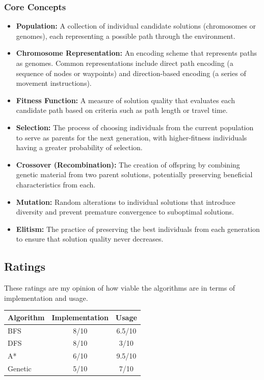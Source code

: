 \subsubsection{Core Concepts}
\begin{itemize}
    \item \textbf{Population:} A collection of individual candidate solutions (chromosomes or genomes), each representing a possible path through the environment.
    
    \item \textbf{Chromosome Representation:} An encoding scheme that represents paths as genomes. Common representations include direct path encoding (a sequence of nodes or waypoints) and direction-based encoding (a series of movement instructions).

    
    \item \textbf{Fitness Function:} A measure of solution quality that evaluates each candidate path based on criteria such as path length or travel time.    
    \item \textbf{Selection:} The process of choosing individuals from the current population to serve as parents for the next generation, with higher-fitness individuals having a greater probability of selection.
    
    \item \textbf{Crossover (Recombination):} The creation of offspring by combining genetic material from two parent solutions, potentially preserving beneficial characteristics from each.
    
    \item \textbf{Mutation:} Random alterations to individual solutions that introduce diversity and prevent premature convergence to suboptimal solutions.
    
    \item \textbf{Elitism:} The practice of preserving the best individuals from each generation to ensure that solution quality never decreases.
\end{itemize}

\subsection{Ratings}
These ratings are my opinion of how viable the algorithms are in terms of implementation and usage. \cite{badrelkari_2024_exploring}

\begin{table}[htbp!]
\centering
\begin{tabular}{|l|c|c|}
\hline
\textbf{Algorithm} & \textbf{Implementation} & \textbf{Usage} \\
\hline
BFS & 8/10 & 6.5/10 \\
\hline
DFS & 8/10 & 3/10 \\
\hline
A* & 6/10 & 9.5/10 \\
\hline
Genetic & 5/10 & 7/10 \\
\hline
\end{tabular}
\end{table}

